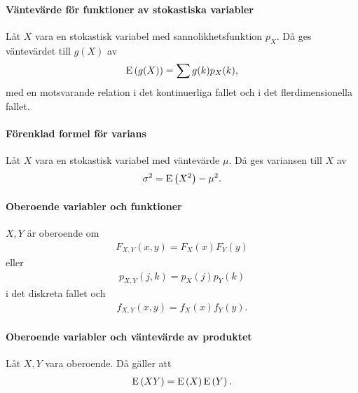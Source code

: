 \proof

\paragraph{Väntevärde för funktioner av stokastiska variabler}
Låt $X$ vara en stokastisk variabel med sannolikhetsfunktion $p_{X}$. Då ges väntevärdet till $g(X)$ av
\begin{align*}
	\text{E}\left(g(X)\right) = \sum g(k)p_{X}(k),
\end{align*}
med en motsvarande relation i det kontinuerliga fallet och i det flerdimensionella fallet.

\proof

\paragraph{Förenklad formel för varians}
Låt $X$ vara en stokastisk variabel med väntevärde $\mu$. Då ges variansen till $X$ av
\begin{align*}
	\sigma^2 = \text{E}\left(X^2\right) - \mu^2.
\end{align*}

\proof

\paragraph{Oberoende variabler och funktioner}
$X, Y$ är oberoende om
\begin{align*}
	F_{X, Y}(x, y) = F_{X}(x)F_{Y}(y)
\end{align*}
eller
\begin{align*}
	p_{X, Y}(j, k) = p_{X}(j)p_{Y}(k)
\end{align*}
i det diskreta fallet och
\begin{align*}
	f_{X, Y}(x, y) = f_{X}(x)f_{Y}(y).
\end{align*}

\proof

\paragraph{Oberoende variabler och väntevärde av produktet}
Låt $X, Y$ vara oberoende. Då gäller att
\begin{align*}
	\text{E}\left(XY\right) = \text{E}\left(X\right)\text{E}\left(Y\right).
\end{align*}

\proof